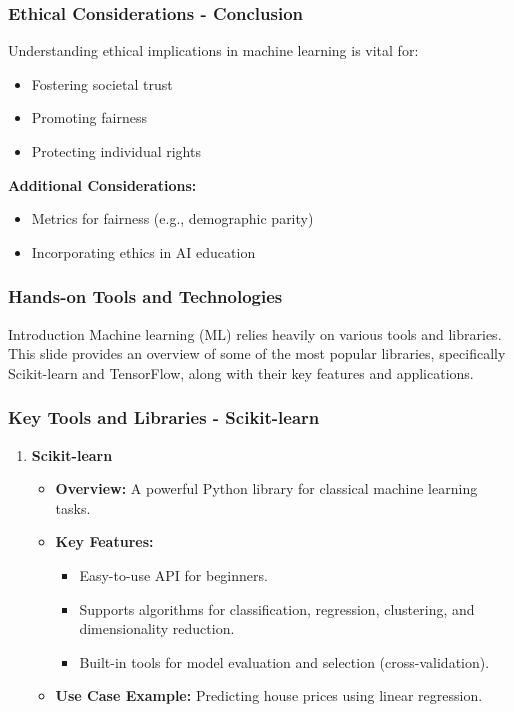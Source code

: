 \documentclass{beamer}
\begin{document}
\begin{frame}[fragile]
    \frametitle{Ethical Considerations - Conclusion}
    Understanding ethical implications in machine learning is vital for:
    \begin{itemize}
        \item Fostering societal trust
        \item Promoting fairness
        \item Protecting individual rights
    \end{itemize}
    
    \textbf{Additional Considerations:}
    \begin{itemize}
        \item Metrics for fairness (e.g., demographic parity)
        \item Incorporating ethics in AI education
    \end{itemize}
\end{frame}

\begin{frame}
    \frametitle{Hands-on Tools and Technologies}
    \begin{block}{Introduction}
        Machine learning (ML) relies heavily on various tools and libraries. This slide provides an overview of some of the most popular libraries, specifically Scikit-learn and TensorFlow, along with their key features and applications.
    \end{block}
\end{frame}

\begin{frame}
    \frametitle{Key Tools and Libraries - Scikit-learn}
    \begin{enumerate}
        \item \textbf{Scikit-learn}
        \begin{itemize}
            \item \textbf{Overview:} A powerful Python library for classical machine learning tasks.
            \item \textbf{Key Features:}
            \begin{itemize}
                \item Easy-to-use API for beginners.
                \item Supports algorithms for classification, regression, clustering, and dimensionality reduction.
                \item Built-in tools for model evaluation and selection (cross-validation).
            \end{itemize}
            \item \textbf{Use Case Example:} Predicting house prices using linear regression.
        \end{itemize}
    \end{enumerate}
\end{frame}
\end{document}
